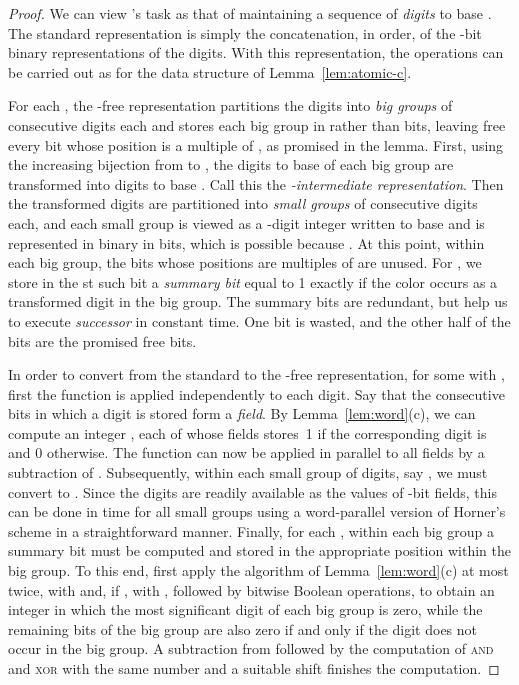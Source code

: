 \documentclass[envcountsame,envcountsect,undated,nolinenumbers]{lnthi}
\def\Tvn#1{\hbox{\textit{#1\/}}}
\begin{document}
\begin{proof}
We can view 's task as that of maintaining a
sequence of  \emph{digits} to base .
The standard representation is simply the concatenation,
in order, of the -bit binary representations of the 
 digits.
With this representation,
the operations can be carried out as for the
data structure of Lemma~\ref{lem:atomic-c}.

For each , the
-free representation partitions the  digits
into \emph{big groups}
of  consecutive digits each and stores
each big group in  rather
than  bits, leaving free every bit whose
position is a multiple of ,
as promised in the lemma.
First, using the increasing bijection
 from 
to , the  digits
to base  of each big group are
transformed into  digits to base .
Call this the \emph{-intermediate representation}.
Then the  transformed digits are partitioned
into  \emph{small groups} of  consecutive digits each,
and each small group is viewed as a -digit integer
written to base  and is represented in binary
in  bits, which is possible because
.
At this point, within each big group, the  bits whose
positions are multiples of  are unused.
For , we store in the st
such bit a \emph{summary bit} equal to 1 exactly if
the color 
occurs as a transformed digit in the big group.
The summary bits are redundant, but help us to
execute \Tvn{successor} in constant time.
One bit is wasted, and
the other half of the
 bits are the promised free bits.

In order to convert  from the standard to the
-free representation, for some 
with , first the function
 is applied independently
to each digit.
Say that the  consecutive bits in which
a digit is stored form a \emph{field}.
By Lemma~\ref{lem:word}(c), we can compute an
integer , each of whose fields stores~1
if the corresponding digit is 
and 0 otherwise.
The function  can now be applied in parallel
to all fields by a subtraction of .
Subsequently, within each small group of 
digits, say , we must
convert  to
.
Since the digits  are readily available
as the values of -bit fields,
this can be done in  time for all small groups
using a word-parallel version of Horner's scheme
in a straightforward manner.
Finally, for
each 
,
within each big group a summary bit
must be computed and
stored in the appropriate position
within the big group.
To this end, first apply the algorithm of
Lemma~\ref{lem:word}(c) at most twice, with  and,
if , with , followed by bitwise
Boolean operations, to obtain an integer in
which the most significant digit of each
big group is zero, while the remaining bits
of the big group are also zero
if and only if the digit  does not occur
in the big group.
A subtraction from 
followed by the computation of \textsc{and}
and \textsc{xor} with the same number and
a suitable shift finishes the computation.


\end{proof}
\end{document}
